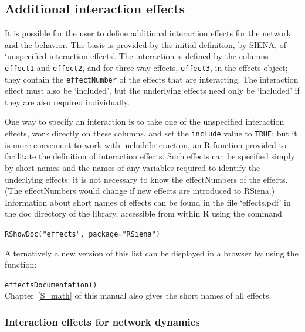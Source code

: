 \documentclass[a4paper,fleqn,11pt]{article}
\newcommand{\+}{\, + \,}
\newcommand{\sfn}[1]{\textsf{#1}}
\newcommand{\R}{{\sf R }}
\newcommand{\rs}{{\sf RSiena}}
\newcommand{\si}{{\sf SIENA}}
\begin{document}
{\hypertarget{T_int_eff}{
\subsection{Additional interaction effects}
}
\label{S_int_eff}

It is possible for the user to define additional interaction effects for the
network and the behavior.
The basis is provided by the initial definition, by \si, of `unspecified
interaction effects'.
The interaction is defined by
the columns \texttt{effect1} and \texttt{effect2},
and for three-way effects, \texttt{effect3},
in the effects object; they contain the \texttt{effectNumber}
of the effects that are interacting.
The interaction effect must also be `included',
but the underlying effects need only be `included' if
they are also required individually.

One way to specify an interaction is to take one of the unspecified
interaction effects, work directly on these columns,
and set the \texttt{include} value to \texttt{TRUE};
but it is more convenient to work with \sfn{includeInteraction},
an \R function provided to facilitate the definition
of interaction effects. Such effects can be specified simply by short names and
the names of any variables required to identify the underlying effects: it is
not necessary to know the effectNumbers of the effects. (The effectNumbers would
change if new effects are introduced to \rs.) Information about short names of
effects can be found in the file `effects.pdf' in the doc directory of the
library, accessible from within \R using the command

\verb|RShowDoc("effects", package="RSiena")|

Alternatively a new version of this list can be displayed in a browser by using
the function:

\verb|effectsDocumentation()| \\
Chapter~\ref{S_math} of this manual also gives the short names of all effects.

\subsubsection{Interaction effects for network dynamics}

}
\end{document}
